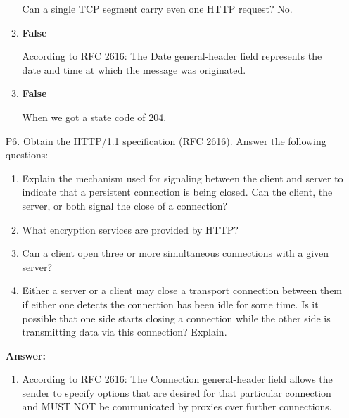 \begin{enumerate}
\begin{enumerate}
        Can a single TCP segment carry even one HTTP request? No.
        
        \item \textbf{False}
        
        According to RFC 2616: The Date general-header field represents the date and time at which the message was originated.
        
        \item \textbf{False}
        
        When we got a state code of 204.
        
    \end{enumerate}
    
    \item [P6.] Obtain the HTTP/1.1 specification (RFC 2616). Answer the following questions: 
    
    \begin{enumerate}
    
        \item Explain the mechanism used for signaling between the client and server to indicate that a persistent connection is being closed. Can the client, the server, or both signal the close of a connection?
        
        \item What encryption services are provided by HTTP?
        
        \item Can a client open three or more simultaneous connections with a given server?
        
        \item Either a server or a client may close a transport connection between them if either one detects the connection has been idle for some time. Is it possible that one side starts closing a connection while the other side is transmitting data via this connection? Explain.
        
    \end{enumerate}
    
    \textbf{Answer:}
    
    \begin{enumerate}
        
        \item According to RFC 2616: The Connection general-header field allows the sender to specify options that are desired for that particular connection and MUST NOT be communicated by proxies over further connections.
        

\end{enumerate}
\end{enumerate}
